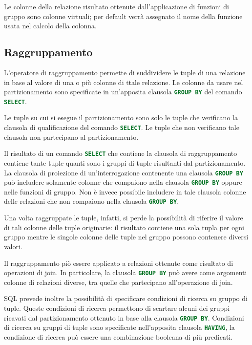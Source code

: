 Le colonne della relazione risultato ottenute dall'applicazione di funzioni di
gruppo sono colonne virtuali; per default verrà assegnato il nome della funzione
usata nel calcolo della colonna.

\subsection{Raggruppamento}%
\label{sub:Raggruppamento}
L'operatore di raggruppamento permette di suddividere le tuple di una relazione
in base al valore di una o più colonne di ttale relazione. Le colonne da usare
nel partizionamento sono specificate in un'apposita clausola
\lstinline[language=SQL]{GROUP BY} del comando \lstinline[language=SQL]{SELECT}.

Le tuple su cui si esegue il partizionamento sono solo le tuple che verificano
la clausola di qualificazione del comando \lstinline[language=SQL]{SELECT}.
Le tuple che non verificano tale clausola non partecipano al partizionamento.

Il risultato di un comando \lstinline[language=SQL]{SELECT} che contiene la
clausola di raggruppamento contiene tante tuple quanti sono i gruppi di tuple
risultanti dal partizionamento.
La clausola di proiezione di un'interrogazione contenente una clausola
\lstinline[language=SQL]{GROUP BY} può includere solamente colonne che compaiono
nella clausola \lstinline[language=SQL]{GROUP BY} oppure nelle funzioni di
gruppo. Non è invece possibile includere in tale clausola colonne delle
relazioni che non compaiono nella clausola \lstinline[language=SQL]{GROUP BY}.

Una volta raggruppate le tuple, infatti, si perde la possibilità di riferire il
valore di tali colonne delle tuple originarie: il risultato contiene una sola
tupla per ogni gruppo mentre le singole colonne delle tuple nel gruppo possono
contenere diversi valori.

Il raggruppamento piò essere applicato a relazioni ottenute come risultato di
operazioni di join. In particolare, la clausola 
\lstinline[language=SQL]{GROUP BY} può avere come argomenti colonne di relazioni
diverse, tra quelle che partecipano all'operazione di join.

SQL prevede inoltre la possibilità di specificare condizioni di ricerca su
gruppo di tuple. Queste condizioni di ricerca permettono di scartare alcuni dei
gruppi ricavati dal partizionamento ottenuto in base alla clausola
\lstinline[language=SQL]{GROUP BY}.
Condizioni di ricerca su gruppi di tuple sono specificate nell'apposita clausola
\lstinline[language=SQL]{HAVING}, la condizione di ricerca può essere una
combinazione booleana di più predicati.

